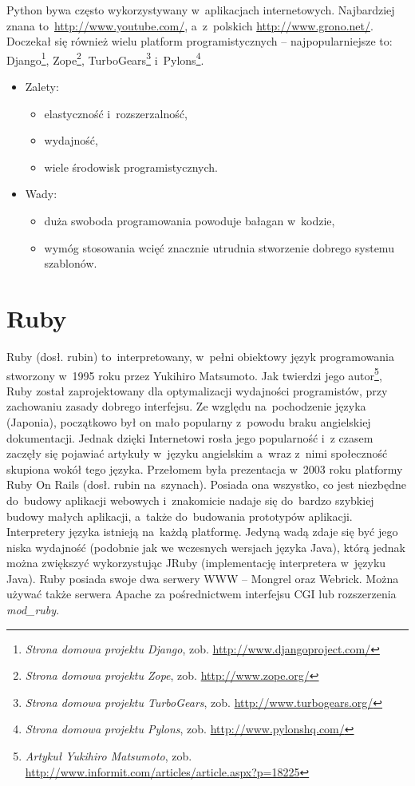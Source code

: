 \documentclass[a4paper,12pt,oneside]{report}
\begin{document}
Python bywa często wykorzystywany w~aplikacjach internetowych. Najbardziej znana to~\url{http://www.youtube.com/}, a~z~polskich \url{http://www.grono.net/}. Doczekał się również wielu platform programistycznych -- najpopularniejsze to: Django\footnote{\emph{Strona domowa projektu Django}, zob. \url{http://www.djangoproject.com/}}, Zope\footnote{\emph{Strona domowa projektu Zope}, zob. \url{http://www.zope.org/}}, TurboGears\footnote{\emph{Strona domowa projektu TurboGears}, zob. \url{http://www.turbogears.org/}} i~Pylons\footnote{\emph{Strona domowa projektu Pylons}, zob. \url{http://www.pylonshq.com/}}.

\begin{itemize}
  \item Zalety:
  \begin{itemize}
    \item elastyczność i~rozszerzalność,
    \item wydajność,
    \item wiele środowisk programistycznych.
  \end{itemize}
  \item Wady:
  \begin{itemize}
    \item duża swoboda programowania powoduje bałagan w~kodzie,
    \item wymóg stosowania wcięć znacznie utrudnia stworzenie dobrego systemu szablonów.
  \end{itemize}
\end{itemize}

\section{Ruby}
\label{sec:ror}
Ruby (dosł. rubin) to~interpretowany, w~pełni obiektowy język programowania stworzony w~1995 roku przez Yukihiro Matsumoto. Jak twierdzi jego autor\footnote{\emph{Artykuł Yukihiro Matsumoto}, zob. \url{http://www.informit.com/articles/article.aspx?p=18225}}, Ruby został zaprojektowany dla optymalizacji wydajności programistów, przy zachowaniu zasady dobrego interfejsu. Ze względu na~pochodzenie języka (Japonia), początkowo był on mało popularny z~powodu braku angielskiej dokumentacji. Jednak dzięki Internetowi rosła jego popularność i~z czasem zaczęły się pojawiać artykuły w~języku angielskim a~wraz z~nimi społeczność skupiona wokół tego języka. Przełomem była prezentacja w~2003 roku platformy Ruby On Rails (dosł. rubin na~szynach). Posiada ona wszystko, co jest niezbędne do~budowy aplikacji webowych i~znakomicie nadaje się do~bardzo szybkiej budowy małych aplikacji, a~także do~budowania prototypów aplikacji. Interpretery języka istnieją na~każdą platformę. Jedyną wadą zdaje się być jego niska wydajność (podobnie jak we wczesnych wersjach języka Java), którą jednak można zwiększyć wykorzystując JRuby (implementację interpretera w~języku Java). Ruby posiada swoje dwa serwery WWW -- Mongrel oraz Webrick. Można używać także serwera Apache za pośrednictwem interfejsu CGI lub rozszerzenia \emph{mod\_ruby}.
\end{document}
